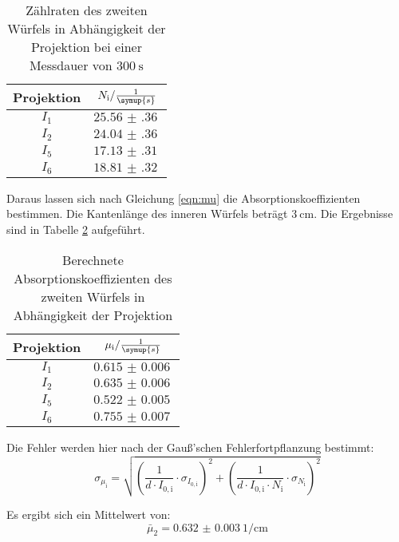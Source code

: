 \begin{table}[H]
  \centering
  \caption{Zählraten des zweiten Würfels in Abhängigkeit der Projektion bei einer Messdauer von $\SI{300}{\second}$ }
  \label{tab:w2}
  \begin{tabular}{c c}
    \toprule
    Projektion & $N_{\mathrm{i}} / \frac{1}{\symup{s}}$   \\
    \midrule
        $I_1$    & $\SI{25.56(36)}{}$ \\
        $I_2$    & $\SI{24.04(36)}{}$ \\
        $I_5$    & $\SI{17.13(31)}{}$ \\
        $I_6$    & $\SI{18.81(32)}{}$ \\
    \bottomrule
  \end{tabular}
\end{table}

Daraus lassen sich nach Gleichung \ref{eqn:mu} die Absorptionskoeffizienten bestimmen.
Die Kantenlänge des inneren Würfels beträgt $\SI{3}{\centi\meter}$.
Die Ergebnisse sind in Tabelle \ref{tab:mu2} aufgeführt.

\begin{table}[H]
  \centering
  \caption{Berechnete Absorptionskoeffizienten des zweiten Würfels in Abhängigkeit der Projektion}
  \label{tab:mu2}
  \begin{tabular}{c c}
    \toprule
    Projektion & $\mu_{\mathrm{i}} / \frac{1}{\symup{s}}$   \\
    \midrule
        $I_1$    & $\SI{0.615(6)}{}$ \\
        $I_2$    & $\SI{0.635(6)}{}$ \\
        $I_5$    & $\SI{0.522(5)}{}$ \\
        $I_6$    & $\SI{0.755(7)}{}$ \\
    \bottomrule
  \end{tabular}
\end{table}

Die Fehler werden hier nach der Gauß'schen Fehlerfortpflanzung bestimmt:
\begin{equation*}
  \sigma_{\mu_{\mathrm{i}}} = \sqrt{\left(\frac{1}{d\cdot I_{0,\mathrm{i}}} \cdot \sigma_{I_{0,\mathrm{i}}} \right)^2 + \left( \frac{1}{d\cdot I_{0,\mathrm{i}} \cdot N_{\mathrm{i}}}
  \cdot \sigma_{N_{\mathrm{i}}} \right)^2}
\end{equation*}

Es ergibt sich ein Mittelwert von:
\begin{equation*}
  \bar\mu_2 = \SI{0.632(3)}{1\per\centi\meter}
\end{equation*}


